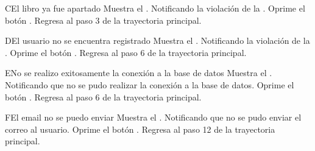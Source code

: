 		\begin{UCtrayectoriaA}{C}{El libro ya fue apartado}
			\UCpaso[\UCsist] Muestra el . Notificando la violación de la .
			\UCpaso[\UCactor] Oprime el botón .
			\UCpaso[\UCsist] Regresa al paso 3 de la trayectoria principal.
		\end{UCtrayectoriaA}
		
		\begin{UCtrayectoriaA}{D}{El usuario no se encuentra registrado}
			\UCpaso[\UCsist] Muestra el . Notificando la violación de la .
			\UCpaso[\UCactor] Oprime el botón .
			\UCpaso[\UCsist] Regresa al paso 6 de la trayectoria principal.
		\end{UCtrayectoriaA}
		
		
		\begin{UCtrayectoriaA}{E}{No se realizo exitosamente la conexión a la base de datos}
			\UCpaso[\UCsist] Muestra el . Notificando que no se pudo realizar la conexión a la base de datos.
			\UCpaso[\UCactor] Oprime el botón .
			\UCpaso[\UCsist] Regresa al paso 6 de la trayectoria principal.
		\end{UCtrayectoriaA}
		
		\begin{UCtrayectoriaA}{F}{El email no se puedo enviar}
			\UCpaso[\UCsist] Muestra el . Notificando que no se pudo enviar el correo al usuario.
			\UCpaso[\UCactor] Oprime el botón .
			\UCpaso[\UCsist] Regresa al paso 12 de la trayectoria principal.
		\end{UCtrayectoriaA}
		
